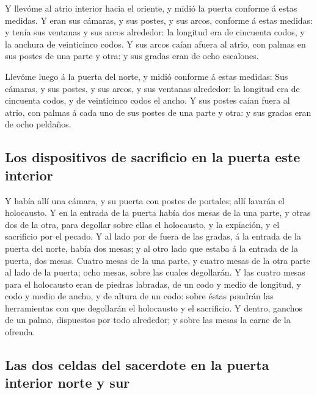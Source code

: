  Y llevóme al atrio interior hacia el oriente, y midió la
puerta conforme á estas medidas.  Y eran sus cámaras, y sus
postes, y sus arcos, conforme á estas medidas: y tenía sus ventanas y
sus arcos alrededor: la longitud era de cincuenta codos, y la anchura de
veinticinco codos.  Y sus arcos caían afuera al atrio, con
palmas en sus postes de una parte y otra: y sus gradas eran de ocho
escalones.

 Llevóme luego á la puerta del norte, y midió conforme á
estas medidas:  Sus cámaras, y sus postes, y sus arcos, y
sus ventanas alrededor: la longitud era de cincuenta codos, y de
veinticinco codos el ancho.  Y sus postes caían fuera al
atrio, con palmas á cada uno de sus postes de una parte y otra: y sus
gradas eran de ocho peldaños.

\hypertarget{los-dispositivos-de-sacrificio-en-la-puerta-este-interior}{%
\subsection{Los dispositivos de sacrificio en la puerta este
interior}\label{los-dispositivos-de-sacrificio-en-la-puerta-este-interior}}

 Y había allí una cámara, y su puerta con postes de
portales; allí lavarán el holocausto.  Y en la entrada de
la puerta había dos mesas de la una parte, y otras dos de la otra, para
degollar sobre ellas el holocausto, y la expiación, y el sacrificio por
el pecado.  Y al lado por de fuera de las gradas, á la
entrada de la puerta del norte, había dos mesas; y al otro lado que
estaba á la entrada de la puerta, dos mesas.  Cuatro mesas
de la una parte, y cuatro mesas de la otra parte al lado de la puerta;
ocho mesas, sobre las cuales degollarán.  Y las cuatro
mesas para el holocausto eran de piedras labradas, de un codo y medio de
longitud, y codo y medio de ancho, y de altura de un codo: sobre éstas
pondrán las herramientas con que degollarán el holocausto y el
sacrificio.  Y dentro, ganchos de un palmo, dispuestos por
todo alrededor; y sobre las mesas la carne de la ofrenda.

\hypertarget{las-dos-celdas-del-sacerdote-en-la-puerta-interior-norte-y-sur}{%
\subsection{Las dos celdas del sacerdote en la puerta interior norte y
sur}\label{las-dos-celdas-del-sacerdote-en-la-puerta-interior-norte-y-sur}}

